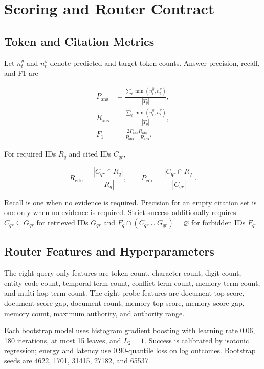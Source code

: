 \section{Scoring and Router Contract}
\label{app:scoring}

\subsection{Token and Citation Metrics}

Let $n_t^{\hat y}$ and $n_t^y$ denote predicted and target token counts. Answer
precision, recall, and F1 are

\begin{align}
P_{\mathrm{ans}} &=
\frac{\sum_t\min(n_t^{\hat y},n_t^y)}{|T_{\hat y}|}, \\
R_{\mathrm{ans}} &=
\frac{\sum_t\min(n_t^{\hat y},n_t^y)}{|T_y|}, \\
F_1 &= \frac{2P_{\mathrm{ans}}R_{\mathrm{ans}}}
{P_{\mathrm{ans}}+R_{\mathrm{ans}}}.
\end{align}

For required IDs $R_q$ and cited IDs $C_{qr}$,

\begin{equation}
R_{\mathrm{cite}}=\frac{|C_{qr}\cap R_q|}{|R_q|},\qquad
P_{\mathrm{cite}}=\frac{|C_{qr}\cap R_q|}{|C_{qr}|}.
\end{equation}

Recall is one when no evidence is required. Precision for an empty citation set is
one only when no evidence is required. Strict success additionally requires
$C_{qr}\subseteq G_{qr}$ for retrieved IDs $G_{qr}$ and
$F_q\cap(C_{qr}\cup G_{qr})=\varnothing$ for forbidden IDs $F_q$.

\subsection{Router Features and Hyperparameters}

The eight query-only features are token count, character count, digit count,
entity-code count, temporal-term count, conflict-term count, memory-term count, and
multi-hop-term count. The eight probe features are document top score, document
score gap, document count, memory top score, memory score gap, memory count,
maximum authority, and authority range.

Each bootstrap model uses histogram gradient boosting with learning rate 0.06,
180 iterations, at most 15 leaves, and $L_2=1$. Success is calibrated by isotonic
regression; energy and latency use 0.90-quantile loss on log outcomes. Bootstrap
seeds are 4622, 1701, 31415, 27182, and 65537.


